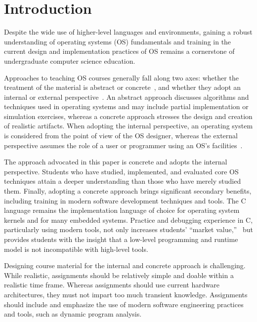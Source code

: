 \section{Introduction}
\label{sec:intro}

Despite the wide use of higher-level languages and environments, gaining a robust
understanding of operating systems (OS) fundamentals and training in the current design and
implementation practices of OS remains a cornerstone of 
undergraduate computer science education.

Approaches to teaching OS courses generally fall along two axes: 
whether the treatment of the material is abstract or 
concrete~\cite{Hovemeyer2004Running}, and whether they adopt an
internal or external perspective~\cite{Deitel2003Operating}.
An abstract approach discusses algorithms and techniques used in operating 
systems and may include partial implementation or simulation exercises,
whereas a concrete approach stresses the design and creation of 
realistic artifacts.
When adopting the internal perspective, an operating system is considered
from the point of view of the OS designer, whereas the external perspective 
assumes the role of a user or programmer using an OS's 
facilities~\cite{Bryant2002Computer}.

The approach advocated in this paper is concrete and adopts the internal perspective.  
Students who have studied, implemented, and evaluated core OS techniques attain 
a deeper understanding than those who have merely studied them.
Finally, adopting a concrete approach brings significant secondary
benefits, including training in modern software development techniques
and tools.  The C language remains the implementation language of choice
for operating system kernels and for many embedded systems.
Practice and debugging experience in C, particularly using modern tools,
not only increases students' ``market value,''~\cite{1292450} but provides students with
the insight that a low-level programming and runtime model is not incompatible
with high-level tools.

Designing course material for the internal and concrete 
approach is challenging.  While realistic, 
assignments should be relatively simple and doable within a realistic time frame.  
Whereas assignments should use current hardware architectures, 
they must not impart too much transient knowledge.
Assignments should include and emphasize the use of modern software 
engineering practices and tools, such as dynamic program analysis.

